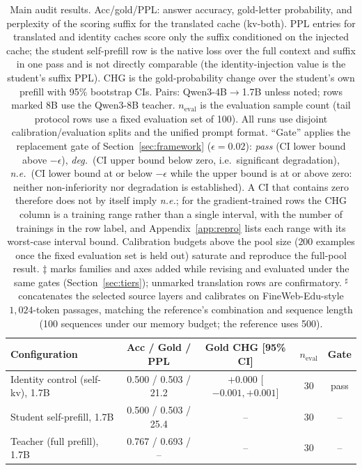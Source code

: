 \documentclass[10pt]{article}
\begin{document}
\begin{table}[t]
\centering
\caption{Main audit results. Acc/gold/PPL: answer accuracy,
gold-letter probability, and perplexity of the scoring suffix for
the translated cache (kv-both). PPL entries for translated and identity
caches score only the suffix conditioned on the injected cache; the student
self-prefill row is the native loss over the full context and suffix in one
pass and is not directly comparable (the identity-injection value is the
student's suffix PPL). CHG is the gold-probability change
over the student's own prefill with 95\% bootstrap CIs. Pairs:
Qwen3-4B$\to$1.7B unless noted; rows marked 8B use the Qwen3-8B
teacher. $n_{\mathrm{eval}}$ is the evaluation sample count (tail
protocol rows use a fixed evaluation set of 100). All runs use
disjoint calibration/evaluation splits and the unified prompt
format. ``Gate'' applies the replacement gate of
Section~\ref{sec:framework} ($\epsilon{=}0.02$): \emph{pass} (CI lower bound
above $-\epsilon$), \emph{deg.}\ (CI upper bound below zero, i.e.\ significant
degradation), \emph{n.e.}\ (CI lower bound at or below $-\epsilon$ while the
upper bound is at or above zero: neither non-inferiority nor degradation is
established). A CI that contains zero therefore does not by itself imply
\emph{n.e.}; for the gradient-trained rows the CHG column is a training range
rather than a single interval, with the number of trainings in the row label,
and Appendix~\ref{app:repro} lists each range with its worst-case interval
bound. Calibration budgets above the pool size ($200$
examples once the fixed evaluation set is held out) saturate and reproduce the
full-pool result.
$\ddagger$ marks families and axes added while revising and evaluated under the
same gates (Section~\ref{sec:tiers}); unmarked translation rows are
confirmatory. $^{\sharp}$ concatenates the selected source layers and
calibrates on FineWeb-Edu-style $1{,}024$-token passages, matching the
reference's combination and sequence length (100 sequences under our
memory budget; the reference uses 500).}
\label{tab:main}
\footnotesize
\setlength{\tabcolsep}{4pt}
\begin{tabular}{lcccc}
\toprule
Configuration & Acc / Gold / PPL & Gold CHG [95\% CI] & $n_{\mathrm{eval}}$ & Gate \\
\midrule
Identity control (self-kv), 1.7B & 0.500 / 0.503 / 21.2 & $+0.000$ [$-0.001, +0.001$] & 30 & pass \\
Student self-prefill, 1.7B & 0.500 / 0.503 / 25.4 & -- & 30 & -- \\
Teacher (full prefill), 1.7B & 0.767 / 0.693 / -- & -- & 30 & -- \\

\end{tabular}
\end{table}
\end{document}
